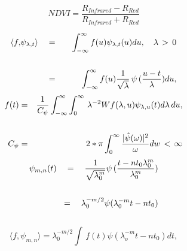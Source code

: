 \documentclass[a4paper, 12pt]{article}
\begin{document}
  $$NDVI=\frac{R_{Infrared}-R_{Red}}{R_{Infrared}+R_{Red}}$$
  
\begin{eqnarray*}
  \langle{f,}\psi_{\lambda,t}\rangle\quad&=&\quad\int_{-\infty}^{\infty}f(u)\psi_{\lambda,t}(u)du,\quad{\lambda\,>\,0}\\
   \vspace{2cm}\\
  &=&\quad\int_{-\infty}^{\infty}f(u)\frac{1}{\sqrt{\lambda}}\,{\psi}\,(\frac{u-t}{\lambda})du,\\
\end{eqnarray*}
\begin{eqnarray*}
	f(t)&=&\frac{1}{C_\psi}\int_{-\infty}^{\infty}\int_{0}^{\infty}\,\lambda^{-2}Wf(\lambda,u)\psi_{\lambda,u}(t)d\lambda\,du,\\
     \vspace{2cm}\\
    C_{\psi}&=&2*\pi\int_{0}^{\infty}\frac{|\hat{\psi}(\omega)|^2}{\omega}dw\,<\,\infty
\end{eqnarray*}
\begin{eqnarray*}
	\psi_{m,n}(t)\quad=\quad\frac{1}{\sqrt{\lambda_0^m}}\psi\,(\frac{t-nt_0\lambda_0^m}{\lambda_0^m})\\
     \vspace{2cm}\\
    =\quad\lambda_0^{-m/2}{\psi}(\lambda_0^{-m}t-nt_0)
\end{eqnarray*}
\vspace{1cm}\\
$$\langle{f,}\psi_{m,n}\rangle=\lambda_0^{-m/2}\int\,f(t)\psi(\lambda_o^{-m}t-nt_0)dt,$$
\end{document}

